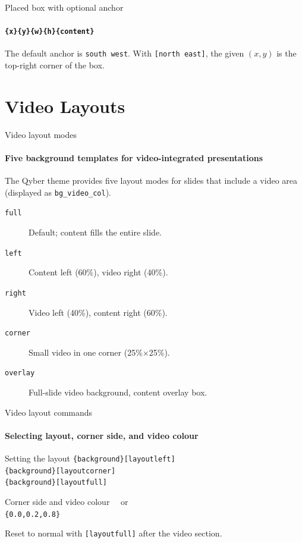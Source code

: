 \documentclass[sans,numeric,titlesplit]{qslides}
\begin{document}
\begin{frame}{Placed box with optional anchor}
  \framesubtitle{\texttt{\string\placebox[anchor]\{x\}\{y\}\{w\}\{h\}\{content\}}}
  The default anchor is \texttt{south west}.  With \texttt{[north east]},
  the given $(x,y)$ is the top-right corner of the box.
\end{frame}

\section{Video Layouts}

\begin{frame}{Video layout modes}
  \framesubtitle{Five background templates for video-integrated presentations}
  The Qyber theme provides five layout modes for slides that include a
  video area (displayed as \texttt{bg\_video\_col}).
  \begin{description}
    \item[\texttt{full}] Default; content fills the entire slide.
    \item[\texttt{left}] Content left (60\%), video right (40\%).
    \item[\texttt{right}] Video left (40\%), content right (60\%).
    \item[\texttt{corner}] Small video in one corner (25\%$\times$25\%).
    \item[\texttt{overlay}] Full-slide video background, content overlay box.
  \end{description}
\end{frame}

\begin{frame}{Video layout commands}
  \framesubtitle{Selecting layout, corner side, and video colour}
  \begin{codeblock}{Setting the layout}
    \texttt{\string\setbeamertemplate\{background\}[layoutleft]}\\
    \texttt{\string\setbeamertemplate\{background\}[layoutcorner]}\\
    \texttt{\string\setbeamertemplate\{background\}[layoutfull]}
  \end{codeblock}
  \begin{codeblock}{Corner side and video colour}
    \texttt{\string\setcornerleft}\ \ or\ \ \texttt{\string\setcornerright}\\[0.5ex]
    \texttt{\string\setvideocolor\{0.0,0.2,0.8\}}
  \end{codeblock}
  Reset to normal with \texttt{[layoutfull]} after the video section.
\end{frame}
\end{document}

